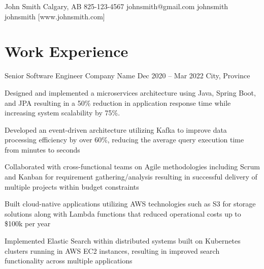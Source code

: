 \documentclass[letterpaper]{resume_config}
\begin{document}
\Header
    {John Smith} %
    {Calgary, AB} %
    {825-123-4567} %
    {johnsmith@gmail.com} %
    {johnsmith} %
    {johnsmith} %
    [www.johnsmith.com] %


\section{Work Experience}

\WorkExperience
    {Senior Software Engineer} %
    {Company Name} %
    {Dec 2020 -- Mar 2022} %
    {City, Province} %
    {
        \item Designed and implemented a microservices architecture using Java, Spring Boot, and JPA resulting in a 50\% reduction in application response time while increasing system scalability by 75\%.
        \item Developed an event-driven architecture utilizing Kafka to improve data processing efficiency by over 60\%, reducing the average query execution time from minutes to seconds
        \item Collaborated with cross-functional teams on Agile methodologies including Scrum and Kanban for requirement gathering/analysis resulting in successful delivery of multiple projects within budget constraints
        \item Built cloud-native applications utilizing AWS technologies such as S3 for storage solutions along with Lambda functions that reduced operational costs up to \$100k per year
        \item Implemented Elastic Search within distributed systems built on Kubernetes clusters running in AWS EC2 instances, resulting in improved search functionality across multiple applications
    } 
\end{document}
